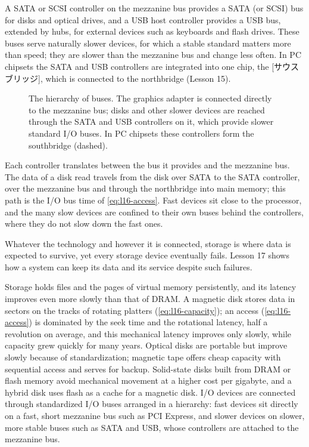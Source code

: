 \documentclass[../main.tex]{subfiles}
\begin{document}
A SATA or SCSI controller on the mezzanine bus provides a SATA (or SCSI) bus
for disks and optical drives, and a USB host controller provides a USB
bus,
extended by hubs, for external devices such as keyboards and flash drives.
These buses serve naturally slower devices, for which a stable standard
matters more than speed; they are slower than the mezzanine bus and change
less often.  In PC chipsets the SATA and USB controllers are integrated into
one chip, the [サウスブリッジ], which is connected to the
northbridge (Lesson 15).

\begin{figure}[htbp]
  \centering
  
  \caption{The hierarchy of buses.  The graphics adapter is connected
    directly to the mezzanine bus; disks and other slower devices are
    reached through the SATA and USB controllers on it, which provide
    slower standard I/O buses.  In PC chipsets these controllers form the
    southbridge (dashed).}
  \label{fig:l16-io-buses}
\end{figure}

Each controller translates between the bus it provides and the mezzanine
bus.  The data of a disk read travels from the disk over SATA to the SATA
controller, over the mezzanine bus and through the northbridge into main
memory; this path is the I/O bus time of \cref{eq:l16-access}.  Fast devices
sit close to the processor, and the many slow devices are confined to their
own buses behind the controllers, where they do not slow down the fast
ones.

Whatever the technology and however it is connected, storage is where data
is expected to survive, yet every storage device eventually fails.  Lesson
17 shows how a system can keep its data and its service despite such
failures.

\begin{keypoint}
  Storage holds files and the pages of virtual memory persistently, and its
  latency improves even more slowly than that of DRAM.  A magnetic disk
  stores data in sectors on the tracks of rotating platters
  (\cref{eq:l16-capacity}); an access (\cref{eq:l16-access}) is dominated by
  the seek time and the rotational latency, half a revolution on average,
  and this mechanical latency improves only slowly, while capacity grew
  quickly for many years.  Optical disks are portable but improve slowly
  because of standardization; magnetic tape offers cheap capacity with
  sequential access
  and serves for backup.  Solid-state disks built from DRAM or flash memory
  avoid mechanical movement at a higher cost per gigabyte, and a hybrid disk
  uses flash as a cache for a magnetic disk.  I/O devices are connected
  through standardized I/O buses arranged in a hierarchy: fast devices sit
  directly on a fast, short mezzanine bus such as PCI Express, and slower
  devices on slower, more stable buses such as SATA and USB, whose
  controllers are attached to the mezzanine bus.
\end{keypoint}
\end{document}
